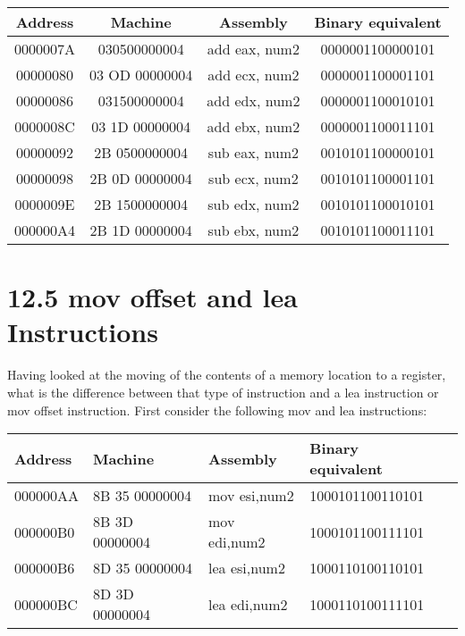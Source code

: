 \documentclass[10pt]{article}
\begin{document}
\begin{center}
\begin{tabular}{|c|c|c|c|}
\hline
Address & Machine & Assembly & Binary equivalent \\
\hline
0000007A & 030500000004 & add eax, num2 & 0000001100000101 \\
\hline
00000080 & 03 OD 00000004 & add ecx, num2 & 0000001100001101 \\
\hline
00000086 & 031500000004 & add edx, num2 & 0000001100010101 \\
\hline
0000008C & 03 1D 00000004 & add ebx, num2 & 0000001100011101 \\
\hline
00000092 & 2B 0500000004 & sub eax, num2 & 0010101100000101 \\
\hline
00000098 & 2B 0D 00000004 & sub ecx, num2 & 0010101100001101 \\
\hline
0000009E & 2B 1500000004 & sub edx, num2 & 0010101100010101 \\
\hline
000000A4 & 2B 1D 00000004 & sub ebx, num2 & 0010101100011101 \\
\hline
\end{tabular}
\end{center}

\section*{12.5 mov offset and lea Instructions}
Having looked at the moving of the contents of a memory location to a register, what is the difference between that type of instruction and a lea instruction or mov offset instruction. First consider the following mov and lea instructions:

\begin{center}
\begin{tabular}{|l|l|l|l|l|}
\hline
Address & Machine & Assembly & Binary equivalent \\
\hline
000000AA & 8B 35 00000004 & mov esi,num2 & 1000101100110101 \\
\hline
000000B0 & 8B 3D 00000004 & mov edi,num2 & 1000101100111101 \\
\hline
000000B6 & 8D 35 00000004 & lea esi,num2 & 1000110100110101 \\
\hline
000000BC & 8D 3D 00000004 & lea edi,num2 & 1000110100111101 \\
\hline
\end{tabular}
\end{center}
\end{document}
